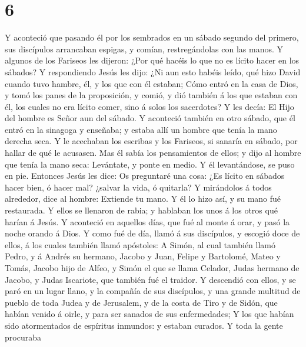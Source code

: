 \hypertarget{section-5}{%
\section{6}\label{section-5}}

 Y aconteció que pasando él por los sembrados en un sábado
segundo del primero, sus discípulos arrancaban espigas, y comían,
restregándolas con las manos.  Y algunos de los Fariseos
les dijeron: ¿Por qué hacéis lo que no es lícito hacer en los sábados?
 Y respondiendo Jesús les dijo: ¿Ni aun esto habéis leído,
qué hizo David cuando tuvo hambre, él, y los que con él estaban;
 Cómo entró en la casa de Dios, y tomó los panes de la
proposición, y comió, y dió también á los que estaban con él, los cuales
no era lícito comer, sino á solos los sacerdotes?  Y les
decía: El Hijo del hombre es Señor aun del sábado.  Y
aconteció también en otro sábado, que él entró en la sinagoga y
enseñaba; y estaba allí un hombre que tenía la mano derecha seca.
 Y le acechaban los escribas y los Fariseos, si sanaría en
sábado, por hallar de qué le acusasen.  Mas él sabía los
pensamientos de ellos; y dijo al hombre que tenía la mano seca:
Levántate, y ponte en medio. Y él levantándose, se puso en pie.
 Entonces Jesús les dice: Os preguntaré una cosa: ¿Es
lícito en sábados hacer bien, ó hacer mal? ¿salvar la vida, ó quitarla?
 Y mirándolos á todos alrededor, dice al hombre: Extiende
tu mano. Y él lo hizo así, y su mano fué restaurada.  Y
ellos se llenaron de rabia; y hablaban los unos á los otros qué harían á
Jesús.  Y aconteció en aquellos días, que fué al monte á
orar, y pasó la noche orando á Dios.  Y como fué de día,
llamó á sus discípulos, y escogió doce de ellos, á los cuales también
llamó apóstoles:  A Simón, al cual también llamó Pedro, y
á Andrés su hermano, Jacobo y Juan, Felipe y Bartolomé, 
Mateo y Tomás, Jacobo hijo de Alfeo, y Simón el que se llama Celador,
 Judas hermano de Jacobo, y Judas Iscariote, que también
fué el traidor.  Y descendió con ellos, y se paró en un
lugar llano, y la compañía de sus discípulos, y una grande multitud de
pueblo de toda Judea y de Jerusalem, y de la costa de Tiro y de Sidón,
que habían venido á oirle, y para ser sanados de sus enfermedades;
 Y los que habían sido atormentados de espíritus
inmundos: y estaban curados.  Y toda la gente procuraba
